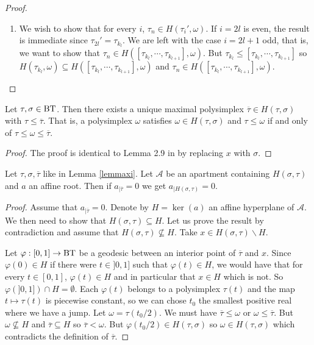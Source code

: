 \documentclass[a4paper,10pt]{amsart}
\begin{document}
\begin{proof}
\begin{enumerate}
\item We wish to show that for every $i$, $\tau_{n} \in H(\tau_{i}',\omega)$. If $i=2l$ is even, the result is immediate since $\tau_{2l}'=\tau_{k_{l}}$. We are left with the case $i=2l+1$ odd, that is, we want to show that $\tau_{n} \in H([\tau_{k_{l}},\cdots,\tau_{k_{l+1}}],\omega)$. But $\tau_{k_{l}} \leq [\tau_{k_{l}},\cdots,\tau_{k_{l+1}}]$ so $H(\tau_{k_{l}},\omega) \subseteq H([\tau_{k_{l}},\cdots,\tau_{k_{l+1}}],\omega)$ and $\tau_{n} \in H([\tau_{k_{l}},\cdots,\tau_{k_{l+1}}],\omega)$.
\end{enumerate}
\end{proof}

\begin{Lem}
\label{lemmaxi}
Let $\tau,\sigma \in \bt$. Then there exists a unique maximal polysimplex $\overline{\tau} \in H(\tau,\sigma)$ with $\tau \leq \overline{\tau}$. That is, a polysimplex $\omega$ satisfies $\omega \in H(\tau,\sigma)$ and $\tau \leq \omega$ if and only of $\tau \leq \omega \leq \overline{\tau}$.
\end{Lem}

\begin{proof}
The proof is identical to Lemma 2.9 in \cite{meyer_resolutions_2010} by replacing $x$ with $\sigma$.
\end{proof}

\begin{Lem}
\label{lemhyperplan}
Let $\tau,\sigma,\overline{\tau}$ like in Lemma \ref{lemmaxi}. Let $\mathcal{A}$ be an apartment containing $H(\sigma,\tau)$ and $a$ an affine root. Then if $a_{|\overline{\tau}}=0$ we get $a_{|H(\sigma,\tau)}=0$.
\end{Lem}

\begin{proof}
Assume that $a_{|\overline{\tau}}=0$. Denote by $H=\ker(a)$ an affine hyperplane of $\mathcal{A}$. We then need to show that $H(\sigma,\tau) \subseteq H$. Let us prove the result by contradiction and assume that $H(\sigma,\tau) \nsubseteq H$. Take $x \in H(\sigma,\tau) \backslash H$.

Let $\varphi : [0,1] \rightarrow \bt$ be a geodesic between an interior point of $\overline{\tau}$ and $x$. Since $\varphi(0) \in H$ if there were $t\in ]0,1]$ such that $\varphi(t)\in H$, we would have that for every $t \in [0,1]$, $\varphi(t) \in H$ and in particular that $x \in H$ which is not. So $\varphi(]0,1]) \cap H = \emptyset$. Each $\varphi(t)$ belongs to a polysimplex $\tau(t)$ and the map $t \mapsto \tau(t)$ is piecewise constant, so we can chose $t_{0}$ the smallest positive real where we have a jump. Let $\omega = \tau(t_{0}/2)$. We must have $\overline{\tau} \leq \omega$ or $\omega \leq \overline{\tau}$. But $\omega \nsubseteq H$ and $\overline{\tau} \subseteq H$ so $\overline{\tau} < \omega$. But $\varphi(t_{0}/2) \in H(\tau,\sigma)$ so $\omega \in H(\tau,\sigma)$ which contradicts the definition of $\overline{\tau}$.
\end{proof}
\end{document}
